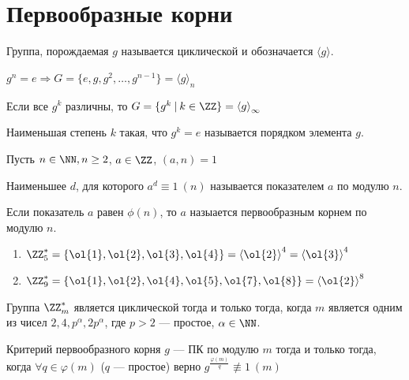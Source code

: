 \newpage

\section{Первообразные корни}

\begin{defn}{}{}
    Группа, порождаемая \( g \) называется циклической и обозначается \( \langle g \rangle \).

    \( g^n = e \Rightarrow G = \{ e, g, g^2, \ldots, g^{n - 1} \} = { \langle g \rangle }_n \)

    Если все \( g^k \) различны, то \( G = \{ g^k \: | \: k \in \ZZ \} = { \langle g \rangle }_{\infty} \)
\end{defn}

\begin{defn}{}{}
    Наименьшая степень \( k \) такая, что \( g^k = e \) называется порядком элемента \( g \).
\end{defn}

\begin{defn}{}{}
    Пусть \( n \in \NN, n \geq 2 \), \( a \in \ZZ \), \( (a, n) = 1 \)

    Наименьшее \( d \), для которого \( a^d \equiv 1 \: (n) \) называется показателем \( a \) по модулю \( n \).

    Если показатель \( a \) равен \( \phi(n) \), то \( a \) назыается первообразным корнем по модулю \( n \).
\end{defn}

\begin{example}{}{}
    \begin{enumerate}
        \item
            \( \ZZ_5^* = \{ \ol{1}, \ol{2}, \ol{3}, \ol{4} \} = { \langle \ol{2} \rangle }^4 = { \langle \ol{3} \rangle }^4 \)
        \item
            \( \ZZ_9^* = \{ \ol{1}, \ol{2}, \ol{4}, \ol{5}, \ol{7}, \ol{8} \} = { \langle \ol{2} \rangle }^8 \)
    \end{enumerate}
\end{example}

\begin{thrm}{}{}
    Группа \( \ZZ_m^* \) является циклической тогда и только тогда,
    когда \( m \) является одним из чисел \( 2, 4, p^{\alpha}, 2p^{\alpha} \),
    где \( p > 2 \) --- простое, \( \alpha \in \NN \).
\end{thrm}

\begin{thrm}{Критерий первообразного корня}{}
    \( g \) --- ПК по модулю \( m \) тогда и только тогда,
    когда \( \forall q \in \varphi(m) \) (\( q \) --- простое) верно
    \( g^{\frac{\varphi(m)}{q}} \not\equiv 1 \: (m) \)
\end{thrm}


